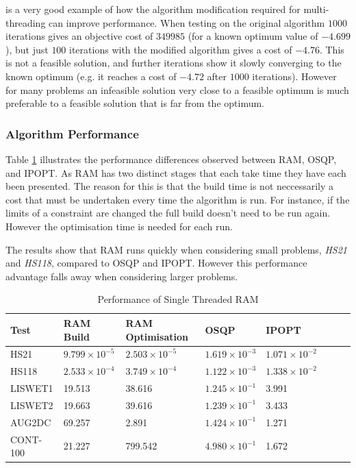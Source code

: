  is a very good example of how the algorithm modification required for multi-threading can improve performance. When testing on the original algorithm $1000$ iterations gives an objective cost of $349985$ (for a known optimum value of $-4.699$), but just $100$ iterations with the modified algorithm gives a cost of $-4.76$. This is not a feasible solution, and further iterations show it slowly converging to the known optimum (e.g. it reaches a cost of $-4.72$ after $1000$ iterations). However for many problems an infeasible solution very close to a feasible optimum is much preferable to a feasible solution that is far from the optimum.

\subsubsection{Algorithm Performance}

Table \ref{table:single_performance} illustrates the performance differences observed between RAM, OSQP, and IPOPT. As RAM has two distinct stages that each take time they have each been presented. The reason for this is that the build time is not neccessarily a cost that must be undertaken every time the algorithm is run. For instance, if the limits of a constraint are changed the full build doesn't need to be run again. However the optimisation time is needed for each run. 

The results show that RAM runs quickly when considering small problems, \textit{HS21} and \textit{HS118}, compared to OSQP and IPOPT. However this performance advantage falls away when considering larger problems.

\begin{table}[h] 
\centering
\begin{tabular}{llllllll} \toprule
    {Test} & {RAM Build}  & {RAM Optimisation} & {OSQP} & {IPOPT} \\ \midrule
    {HS21}      & $9.799\times10^{-5}$ & $2.503\times10^{-5}$ & $1.619\times10^{-3}$ & $1.071\times10^{-2}$ \\ 
    {HS118}     & $2.533\times10^{-4}$ & $3.749\times10^{-4}$ & $1.122\times10^{-3}$ & $1.338\times10^{-2}$ \\
    {LISWET1}   & 19.513               & 38.616               & $1.245\times10^{-1}$ & 3.991 \\ 
    {LISWET2}   & 19.663               & 39.616               & $1.239\times10^{-1}$ & 3.433 \\
    {AUG2DC}    & 69.257               & 2.891                & $1.424\times10^{-1}$ & 1.271 \\
    {CONT-100}  & 21.227               & 799.542              & $4.980\times10^{-1}$ & 1.672 \\ \bottomrule
\end{tabular}
    \caption{\label{table:single_performance}Performance of Single Threaded RAM}
\end{table}


